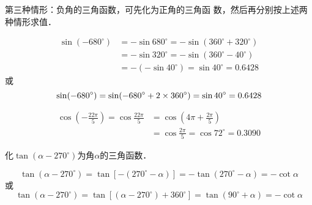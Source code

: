 第三种情形：负角的三角函数，可先化为正角的三角函
数，然后再分别按上述两种情形求值．

\begin{example}
\[\begin{split}
    \sin( -680^{\circ}) &= -\sin680^{\circ} =-\sin(360^{\circ}+320^{\circ})\\
   &=-\sin320^{\circ}
   =-\sin(360^{\circ}-40^{\circ})\\
  & =-(-\sin40^{\circ})   =\sin40^{\circ}=0.6428
\end{split}\]
或$$\sin( -680^{\circ})=\sin( -680^{\circ}+2\times 360^{\circ})=\sin 40^{\circ}=0.6428$$
\end{example}

\begin{example}
    \[\begin{split}
        \cos\left(-\frac{22\pi}{5}\right)=\cos\frac{22\pi}{5}&=\cos\left(4\pi+\frac{2\pi}{5}\right)\\ &=\cos\frac{2\pi}{5}=\cos72^{\circ}=0.3090
    \end{split}\]
\end{example}    


\begin{example}
    化$\tan (\alpha-270^{\circ})$为角$\alpha$的三角函数．
\end{example}

\begin{solution}
$$\tan (\alpha-270^{\circ})=\tan [-(270^{\circ}-\alpha)]
=-\tan (270^{\circ}-\alpha)
=-\cot \alpha$$
或
$$\tan (\alpha-270^{\circ})=\tan[ (\alpha-270^{\circ})+360^{\circ}]
=\tan (90^{\circ}+\alpha)=-\cot \alpha$$
\end{solution}

